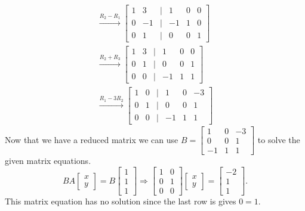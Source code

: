 \begin{example}
\begin{solution}
        \begin{gather*}
            \overset{R_2 - R_1}{\longrightarrow}\begin{bmatrix}
            1 & 3 & \vert & 1 & 0 &0 \\
            0 & -1 & \vert & -1 & 1 & 0 \\
            0 & 1 & \vert & 0 & 0 & 1
        \end{bmatrix}\\
        \overset{R_2 + R_3}{\longrightarrow}\begin{bmatrix}
            1 & 3 & \vert & 1 & 0 &0 \\
            0 & 1 & \vert & 0 & 0 & 1 \\
            0 & 0 & \vert & -1 & 1 & 1
        \end{bmatrix}\\
        \overset{R_1 - 3R_2}{\longrightarrow}\begin{bmatrix}
            1 & 0 & \vert & 1 & 0 &-3 \\
            0 & 1 & \vert & 0 & 0 & 1 \\
            0 & 0 & \vert & -1 & 1 & 1
        \end{bmatrix}
        \end{gather*}
        Now that we have a reduced matrix we can use \(B = \begin{bmatrix}
            1 & 0 &-3 \\
            0 & 0 & 1 \\
            -1 & 1 & 1
        \end{bmatrix}\) to solve the given matrix equations.
        \[BA\begin{bmatrix}
            x\\y
        \end{bmatrix} = B\begin{bmatrix}
            1\\1 \\1
        \end{bmatrix} \Rightarrow \begin{bmatrix}
            1 & 0 \\
            0 & 1 \\
            0 & 0
        \end{bmatrix}\begin{bmatrix}x \\y \end{bmatrix} = \begin{bmatrix}
            -2 \\ 1 \\ 1
        \end{bmatrix}.\] This matrix equation has no solution since the last row is gives \(0=1.\)


\end{solution}
\end{example}
